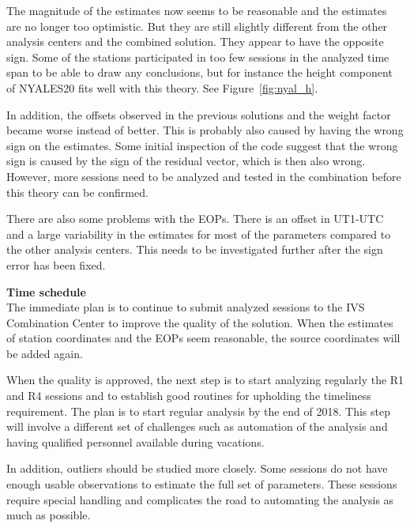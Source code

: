 The magnitude of the estimates now seems to be reasonable and the estimates are no longer too optimistic. But they
are still slightly different from the other analysis centers and the combined solution. They appear to have the
opposite sign.  Some of the stations participated in too few sessions in the analyzed time span to be able to draw any
conclusions, but for instance the height component of NYALES20 fits well with this theory. See Figure~\ref{fig:nyal_h}.

In addition, the offsets observed in the previous solutions and the weight factor became worse instead of better. This
is probably also caused by having the wrong sign on the estimates.  Some initial inspection of the code suggest that
the wrong sign is caused by the sign of the residual vector, which is then also wrong. However, more sessions need to
be analyzed and tested in the combination before this theory can be confirmed.

There are also some problems with the EOPs. There is an offset in UT1-UTC and a large variability in the estimates for
most of the parameters compared to the other analysis centers. This needs to be investigated further after the sign
error has been fixed.

{\large\bfseries Time schedule}\\

The immediate plan is to continue to submit analyzed sessions to the IVS Combination Center to improve the quality of
the solution. When the estimates of station coordinates and the EOPs seem reasonable, the source coordinates will be
added again. 

When the quality is approved, the next step is to start analyzing regularly the R1 and R4 sessions and to
establish good routines for upholding the timeliness requirement. The plan is to start regular analysis by the end of
2018. This step will involve a different set of challenges such as automation of the analysis and having qualified
personnel available during vacations.

In addition, outliers should be studied more closely. Some sessions do not have enough usable observations to estimate
the full set of parameters. These sessions require special handling and complicates the road to automating the analysis
as much as possible.

\vspace*{15ex}

\endinput
